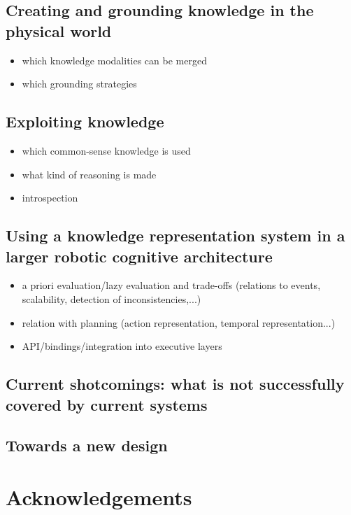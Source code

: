 \documentclass[a4paper, twocolumn]{article}
\begin{document}
\subsection{Creating and grounding knowledge in the physical world}
\label{sect|summary-grounding}


\begin{itemize}
	\item which knowledge modalities can be merged
	\item which grounding strategies
\end{itemize}


\subsection{Exploiting knowledge}
\label{sect|summary-knowledge-sources-reasoning}

\begin{itemize}
	\item which common-sense knowledge is used
	\item what kind of reasoning is made
	\item introspection
\end{itemize}


\subsection{Using a knowledge representation system in a larger robotic cognitive architecture}
\label{sect|summary-integration}

\begin{itemize}
	\item a priori evaluation/lazy evaluation and trade-offs (relations to events, scalability, detection of inconsistencies,...)
	\item relation with planning (action representation, temporal representation...)
	\item API/bindings/integration into executive layers
\end{itemize}

\subsection{Current shotcomings: what is not successfully covered by current systems}

\subsection{Towards a new design}

\section*{Acknowledgements} 




\end{document}
